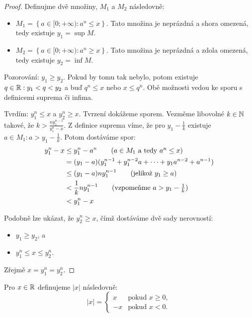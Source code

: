 \begin{proof}
    Definujme dvě množiny, $M_1$ a $M_2$ následovně:
    \begin{itemize}
        \item $M_1 = \left\{a \in [0;+\infty): a^n \leq x\right\}$. Tato množina
                je neprázdná a shora omezená, tedy existuje $y_1 = \sup M$.
        \item $M_2 = \left\{a \in [0;+\infty): a^n \geq x\right\}$. Tato množina
                je neprázdná a zdola omezená, tedy existuje $y_2 = \inf M$.
   \end{itemize}

   Pozorování: $y_1 \geq y_2$. Pokud by tomu tak nebylo, potom existuje $q \in \mathbb{R}:
   y_1 < q < y_2$ a buď $q^n \leq x$ nebo $x \leq q^n$. Obě možnosti vedou ke 
   sporu s definicemi suprema či infima.

   Tvrdím: $y_1^n \leq x$ a $y_2^n \geq x$. Tvrzení dokážeme sporem. Vezměme
   libovolné $k \in \mathbb{N}$ takové, že $k > \frac{ny_1^{n-1}}{y_1^n - x}$. Z
   definice suprema víme, že pro $y_1 - \frac{1}{k}$ existuje $a \in M_1: 
   a > y_1 - \frac{1}{k}$. Potom dostáváme spor:
   \begin{align*}
       y_1^n - x &\leq y_1^n - a^n \tag{$a \in M_1$ a tedy $a^n \leq x$} \\
                 &= (y_1 -a)(y_1^{n-1} + y_1^{n-2}a + \dots + y_1a^{n-2} + a^{n-1}) \\
                 &\leq (y_1-a)ny_1^{n-1} \tag{jelikož $y_1 \geq a$}\\
                 &< \frac{1}{k}ny_1^{n-1} \tag{vzpomeňme $a > y_1 - \frac{1}{k}$}\\
                 &< y_1^n-x
   \end{align*}

   Podobně lze ukázat, že $y_2^n \geq x$, čímž dostáváme dvě sady nerovností:
   \begin{itemize}
       \item $y_1 \geq y_2$, a
       \item $y_1^n \leq x \leq y_2^n$.
   \end{itemize}
   Zřejmě $x = y_1^n = y_2^n$.
\end{proof}

\begin{definition}
    Pro $x \in \mathbb{R}$ definujeme  $|x|$ následovně:
    $$|x| = \begin{cases}
        x &\text{pokud $x \geq 0,$} \\
        -x &\text{pokud $x < 0$.}
    \end{cases}$$
\end{definition}

